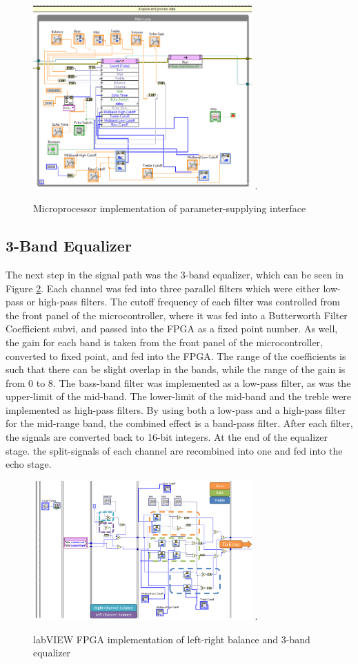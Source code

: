 \begin{figure}[!t]
\centering
\includegraphics[width=3.3in]{microcontroller.png}
\DeclareGraphicsExtensions.
\caption{Microprocessor implementation of parameter-supplying interface}
\label{fig_AEPUMicro}
\end{figure}

\subsection{3-Band Equalizer}
The next step in the signal path was the 3-band equalizer, which can be seen in Figure \ref{fig_BEQ}. 
Each channel was fed into three parallel filters which were either low-pass or high-pass filters.
The cutoff frequency of each filter was controlled from the front panel of the microcontroller, where it was fed into a Butterworth Filter Coefficient subvi, and passed into the FPGA as a fixed point number.
As well, the gain for each band is taken from the front panel of the microcontroller, converted to fixed point, and fed into the FPGA.
The range of the coefficients is such that there can be slight overlap in the bands, while the range of the gain is from 0 to 8.
The bass-band filter was implemented as a low-pass filter, as was the upper-limit of the mid-band.
The lower-limit of the mid-band and the treble were implemented as high-pass filters.
By using both a low-pass and a high-pass filter for the mid-range band, the combined effect is a band-pass filter.
After each filter, the signals are converted back to 16-bit integers.
At the end of the equalizer stage. the split-signals of each channel are recombined into one and fed into the echo stage.

\begin{figure}[!t]
\centering
\includegraphics[width=3.3in]{balanceandeq.png}
\DeclareGraphicsExtensions.
\caption{labVIEW FPGA implementation of left-right balance and 3-band equalizer}
\label{fig_BEQ}
\end{figure}  


